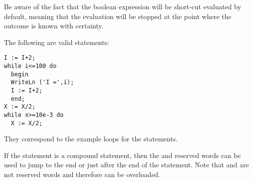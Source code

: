 Be aware of the fact that the boolean expression  will be 
short-cut evaluated by default, meaning that the evaluation will be stopped 
at the point where the outcome is known with certainty.

The following are valid  statements:
\begin{verbatim}
I := I+2;
while i<=100 do
  begin
  WriteLn ('I =',i);
  I := I+2;
  end;
X := X/2;
while x>=10e-3 do
  X := X/2;
\end{verbatim}
They correspond to the example loops for the  statements.

If the statement is a compound statement, then  the  and
 reserved words can be used to jump to the end or just
after the end of the  statement.
Note that  and  are not reserved words and
therefore can be overloaded.

